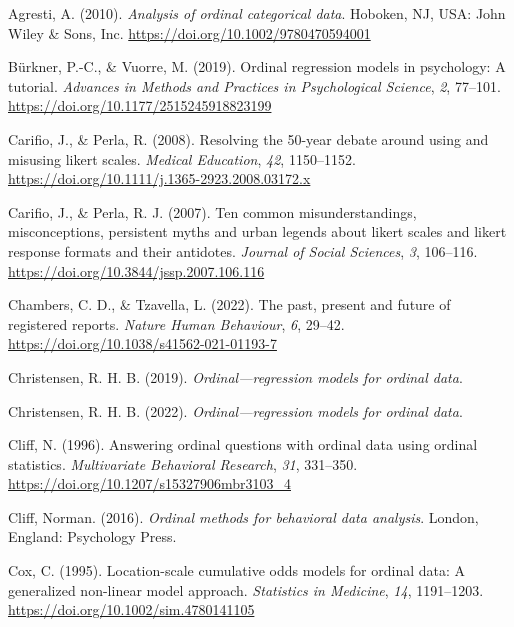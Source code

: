 \documentclass[
  man, mask,floatsintext]{apa6}
\newlength{\cslhangindent}
\newenvironment{CSLReferences}[2] %
 {\begin{list}{}{%
  \setlength{\itemindent}{0pt}
  \setlength{\leftmargin}{0pt}
  \setlength{\parsep}{0pt}
  \ifodd #1
   \setlength{\leftmargin}{\cslhangindent}
   \setlength{\itemindent}{-1\cslhangindent}
  \fi
  \setlength{\itemsep}{#2\baselineskip}}}
 {\end{list}}
\begin{document}
\label{refs}
\begin{CSLReferences}{1}{0}
Agresti, A. (2010). \emph{Analysis of ordinal categorical data}. Hoboken, NJ, USA: John Wiley \& Sons, Inc. \url{https://doi.org/10.1002/9780470594001}

Bürkner, P.-C., \& Vuorre, M. (2019). Ordinal regression models in psychology: A tutorial. \emph{Advances in Methods and Practices in Psychological Science}, \emph{2}, 77--101. \url{https://doi.org/10.1177/2515245918823199}

Carifio, J., \& Perla, R. (2008). Resolving the 50-year debate around using and misusing likert scales. \emph{Medical Education}, \emph{42}, 1150--1152. \url{https://doi.org/10.1111/j.1365-2923.2008.03172.x}

Carifio, J., \& Perla, R. J. (2007). Ten common misunderstandings, misconceptions, persistent myths and urban legends about likert scales and likert response formats and their antidotes. \emph{Journal of Social Sciences}, \emph{3}, 106--116. \url{https://doi.org/10.3844/jssp.2007.106.116}

Chambers, C. D., \& Tzavella, L. (2022). The past, present and future of registered reports. \emph{Nature Human Behaviour}, \emph{6}, 29--42. \url{https://doi.org/10.1038/s41562-021-01193-7}

Christensen, R. H. B. (2019). \emph{Ordinal---regression models for ordinal data}.

Christensen, R. H. B. (2022). \emph{Ordinal---regression models for ordinal data}.

Cliff, N. (1996). Answering ordinal questions with ordinal data using ordinal statistics. \emph{Multivariate Behavioral Research}, \emph{31}, 331--350. \url{https://doi.org/10.1207/s15327906mbr3103_4}

Cliff, Norman. (2016). \emph{Ordinal methods for behavioral data analysis}. London, England: Psychology Press.

Cox, C. (1995). Location-scale cumulative odds models for ordinal data: A generalized non-linear model approach. \emph{Statistics in Medicine}, \emph{14}, 1191--1203. \url{https://doi.org/10.1002/sim.4780141105}


\end{CSLReferences}
\end{document}
